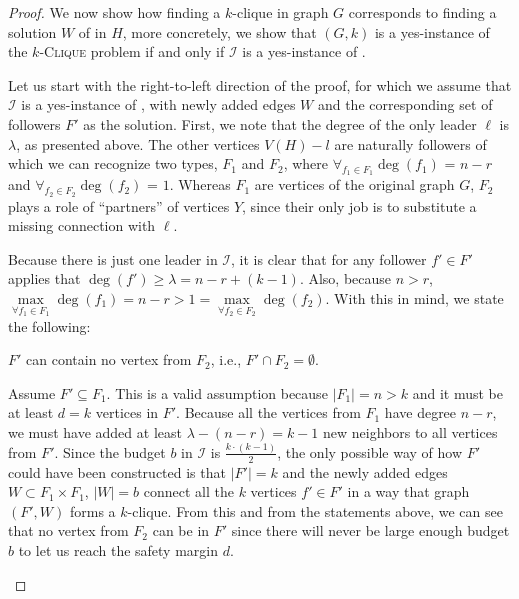 \begin{proof}
    We now show how finding a $k$-clique in graph $G$ corresponds to finding a solution $W$ of \HLshort in $H$, more concretely,
    we show that $(G, k)$ is a yes-instance of the $k$-\textsc{Clique} problem if and only if $\mathcal{I}$ is a yes-instance of \HLdeg.
    
    Let us start with the right-to-left direction of the proof, for which we assume that $\mathcal{I}$ is a yes-instance of \HLdeg,
    with newly added edges $W$ and the corresponding set of followers $F'$ as the solution. 
    First, we note that the degree of the only leader $\ell$ is $\lambda$, as presented above.
    The other vertices $V(H) - l$ are naturally followers of which we can recognize two types, $F_1$ and $F_2$,
    where $\forall_{f_1 \in F_1} \deg(f_1)$ = $n-r$ and $\forall_{f_2 \in F_2} \deg(f_2)$ = $1$.
    Whereas $F_1$ are vertices of the original graph $G$,
    $F_2$ plays a role of ``partners'' of vertices $Y$, since their only job is to substitute a missing connection with $\ell$.

    Because there is just one leader in $\mathcal{I}$, it is clear that for any follower $f' \in F'$ applies that
    $\deg(f') \geq \lambda = n - r + (k - 1)$.
    Also, because $n > r$, $\max\limits_{\forall f_1 \in F_1}\deg(f_1) = n-r > 1 = \max\limits_{\forall f_2 \in F_2}\deg(f_2)$.
    With this in mind, we state the following:

    \begin{lemma}\label{lemmaInProof}
        $F'$ can contain no vertex from $F_2$, i.e., $F' \cap F_2 = \emptyset$.
    \end{lemma}
    \begin{subproof}
        Assume $F' \subseteq F_1$. This is a valid assumption because $|F_1| = n > k$ and it must be at least $d = k$ vertices in $F'$.
        Because all the vertices from $F_1$ have degree $n-r$, we must have added at least $\lambda - (n - r) = k - 1$ new neighbors to all vertices from $F'$.
        Since the budget $b$ in $\mathcal{I}$ is $\frac{k\cdot(k-1)}{2}$,
        the only possible way of how $F'$ could have been constructed is that $|F'|=k$ and the newly added edges $W \subset F_1 \times F_1$, $|W| = b$
        connect all the $k$ vertices $f' \in F'$ in a way that graph $(F', W)$ forms a $k$-clique.
        From this and from the statements above, we can see that no vertex from $F_2$ can be in $F'$
        since there will never be large enough budget $b$ to let us reach the safety margin $d$.
    \end{subproof}


\end{proof}
